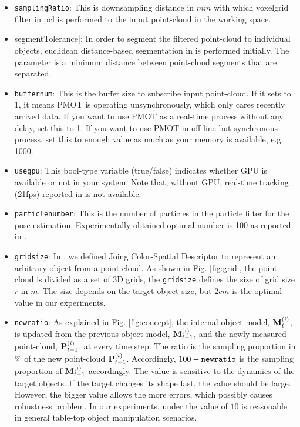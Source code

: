 \documentclass[a4paper,twoside, openright,12pt]{report}
\begin{document}
\begin{itemize}
	\item{\verb|samplingRatio|}: This is downsampling distance in $mm$ with which voxelgrid filter in pcl \cite{Rusu_ICRA2011_PCL} is performed to the input point-cloud in the working space. 
	\item{\verb||segmentTolerance|}: In order to segment the filtered point-cloud to individual objects, euclidean distance-based segmentation in \cite{Rusu_ICRA2011_PCL} is performed initially. The parameter is a minimum distance between point-cloud segments that are separated. 
	\item{\verb|buffernum|}: This is the buffer size to subscribe input point-cloud. If it sets to 1, it means PMOT is operating unsynchronously, which only cares recently arrived data. If you want to use PMOT as a real-time process without any delay, set this to 1. If you want to use PMOT in off-line but synchronous process, set this to enough value as much as your memory is available, e.g. 1000.  
	\item{\verb|usegpu|}: This bool-type variable (true/false) indicates whether GPU is available or not in your system. Note that, without GPU, real-time tracking (21fps) reported in \cite{li2015realtime} is not available. 
	\item{\verb|particlenumber|}: This is the number of particles in the particle filter for the pose estimation. Experimentally-obtained optimal number is 100 as reported in \cite{li2015realtime}. 
	\item{\verb|gridsize|}: In \cite{li2015realtime}, we defined Joing Color-Spatial Descriptor to represent an arbitrary object from a point-cloud. As shown in Fig. \ref{fig:grid}, the point-cloud is divided as a set of 3D grids, the \verb|gridsize| defines the size of grid size $r$ in $m$. The size depends on the target object size, but $2cm$ is the optimal value in our experiments. 
	\item{\verb|newratio|}: As explained in Fig. \ref{fig:concept}, the internal object model, ${\bf{M}}_t^{(i)}$, is updated from the previous object model, ${\bf{M}}_{t-1}^{(i)}$, and the newly measured point-cloud, ${\bf{P}}_{t-1}^{(i)}$, at every time step. The ratio is the sampling proportion in $\%$ of the new point-cloud ${\bf{P}}_{t-1}^{(i)}$. Accordingly, $100-\verb|newratio|$ is the sampling proportion of ${\bf{M}}_{t-1}^{(i)}$ accordingly. The value is sensitive to the dynamics of the target objects. If the target changes its shape fast, the value should be large. However, the bigger value allows the more errors, which possibly causes robustness problem. In our experiments, under the value of $10$ is reasonable in general table-top object manipulation scenarios. 
\end{itemize}
\end{document}

